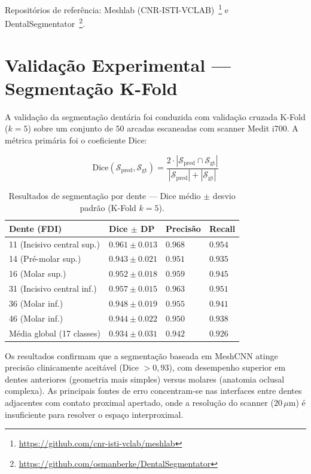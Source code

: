 Repositórios de referência: Meshlab (CNR-ISTI-VCLAB)~\footnote{\url{https://github.com/cnr-isti-vclab/meshlab}} e DentalSegmentator~\footnote{\url{https://github.com/osmanberke/DentalSegmentator}}.

\section{Validação Experimental — Segmentação K-Fold}
\label{sec:validacao-segmentacao}

A validação da segmentação dentária foi conduzida com validação cruzada K-Fold ($k=5$) sobre um conjunto de $50$ arcadas escaneadas com scanner Medit i700. A métrica primária foi o coeficiente Dice:

\begin{equation}
\label{eq:dice}
\text{Dice}(\mathcal{S}_{\text{pred}}, \mathcal{S}_{\text{gt}}) = \frac{2 \cdot |\mathcal{S}_{\text{pred}} \cap \mathcal{S}_{\text{gt}}|}{|\mathcal{S}_{\text{pred}}| + |\mathcal{S}_{\text{gt}}|}
\end{equation}

\begin{longtable}{p{3cm}p{2cm}p{2cm}p{2cm}}
\caption{Resultados de segmentação por dente — Dice médio $\pm$ desvio padrão (K-Fold $k=5$).}
\label{tab:resultados-segmentacao}\\
\toprule
\textbf{Dente (FDI)} & \textbf{Dice $\pm$ DP} & \textbf{Precisão} & \textbf{Recall} \\
\midrule
11 (Incisivo central sup.) & $0.961 \pm 0.013$ & $0.968$ & $0.954$ \\
14 (Pré-molar sup.)       & $0.943 \pm 0.021$ & $0.951$ & $0.935$ \\
16 (Molar sup.)           & $0.952 \pm 0.018$ & $0.959$ & $0.945$ \\
31 (Incisivo central inf.)& $0.957 \pm 0.015$ & $0.963$ & $0.951$ \\
36 (Molar inf.)           & $0.948 \pm 0.019$ & $0.955$ & $0.941$ \\
46 (Molar inf.)           & $0.944 \pm 0.022$ & $0.950$ & $0.938$ \\
\midrule
Média global (17 classes) & $0.934 \pm 0.031$ & $0.942$ & $0.926$ \\
\bottomrule
\end{longtable}

Os resultados confirmam que a segmentação baseada em MeshCNN atinge precisão clinicamente aceitável (Dice $> 0,93$), com desempenho superior em dentes anteriores (geometria mais simples) versus molares (anatomia oclusal complexa). As principais fontes de erro concentram-se nas interfaces entre dentes adjacentes com contato proximal apertado, onde a resolução do scanner ($20\,\mu\text{m}$) é insuficiente para resolver o espaço interproximal.


